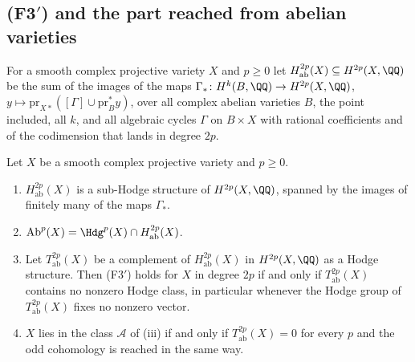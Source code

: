\subsection{(F3$'$) and the part reached from abelian varieties}
\label{ssec:abpart}

\begin{definition}\label{def:abpart}
For a smooth complex projective variety $X$ and $p\ge0$ let
$H^{2p}_{\mathrm{ab}}(X)\subseteq H^{2p}(X,\QQ)$ be the sum of the images of
the maps
$\Gamma_{*}\colon H^{k}(B,\QQ)\to H^{2p}(X,\QQ)$,
$y\mapsto\mathrm{pr}_{X*}([\Gamma]\cup\mathrm{pr}_{B}^{*}y)$, over all
complex abelian varieties $B$, the point included, all $k$, and all algebraic
cycles $\Gamma$ on $B\times X$ with rational coefficients and of the
codimension that lands in degree $2p$.
\end{definition}

\begin{proposition}\label{prop:abpart}
Let $X$ be a smooth complex projective variety and $p\ge0$.
\begin{enumerate}[label=\textup{(\roman*)},leftmargin=2.6em,itemsep=2pt]
\item $H^{2p}_{\mathrm{ab}}(X)$ is a sub-Hodge structure of
  $H^{2p}(X,\QQ)$, spanned by the images of finitely many of the maps
  $\Gamma_{*}$.
\item $\mathrm{Ab}^{p}(X)=\Hdg^{p}(X)\cap H^{2p}_{\mathrm{ab}}(X)$.
\item Let $T^{2p}_{\mathrm{ab}}(X)$ be a complement of
  $H^{2p}_{\mathrm{ab}}(X)$ in $H^{2p}(X,\QQ)$ as a Hodge structure. Then
  \textup{(F3$'$)} holds for $X$ in degree $2p$ if and only if
  $T^{2p}_{\mathrm{ab}}(X)$ contains no nonzero Hodge class, in particular
  whenever the Hodge group of $T^{2p}_{\mathrm{ab}}(X)$ fixes no nonzero
  vector.
\item $X$ lies in the class $\mathcal{A}$ of (iii) if and
  only if $T^{2p}_{\mathrm{ab}}(X)=0$ for every $p$ and the odd cohomology is
  reached in the same way.
\end{enumerate}
\end{proposition}

